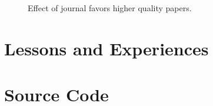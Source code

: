 \documentclass[11pt]{article}
\begin{document}
\begin{figure}[!th]
\begin{center}
\caption{Effect of journal favors higher quality papers.}
\end{center}
\end{figure}

\newpage

\section{Lessons and Experiences}

\newpage




\newpage

\appendix
\section{Source Code}

















\end{document}
